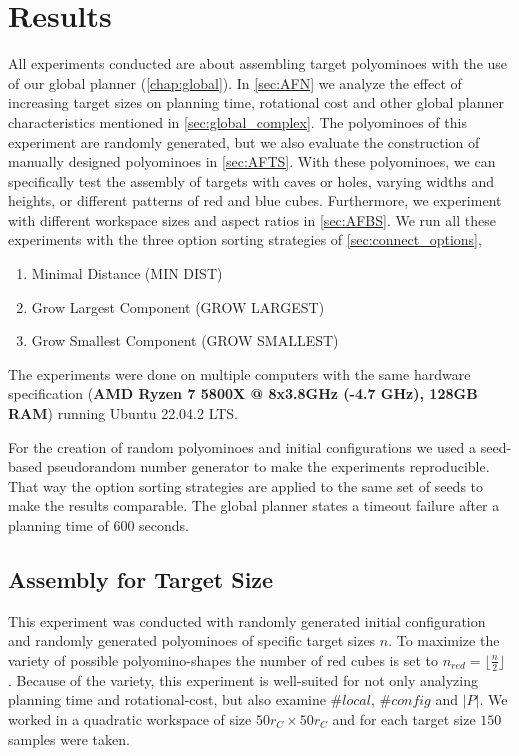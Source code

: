\chapter{Results}
\label{chap:results}

All experiments conducted are about assembling target polyominoes with the use of our global planner (\autoref{chap:global}).
In \autoref{sec:AFN} we analyze the effect of increasing target sizes on planning time, rotational cost and other global planner characteristics mentioned in \autoref{sec:global_complex}.
The polyominoes of this experiment are randomly generated, but we also evaluate the construction of manually designed polyominoes in \autoref{sec:AFTS}.
With these polyominoes, we can specifically test the assembly of targets with caves or holes, varying widths and heights, or different patterns of red and blue cubes. 
Furthermore, we experiment with different workspace sizes and aspect ratios in \autoref{sec:AFBS}.
We run all these experiments with the three option sorting strategies of \autoref{sec:connect_options},
\begin{enumerate}
	\item Minimal Distance (MIN DIST)
	\item Grow Largest Component (GROW LARGEST)
	\item Grow Smallest Component (GROW SMALLEST)
\end{enumerate}

The experiments were done on multiple computers with the same hardware specification (\textbf{AMD Ryzen 7 5800X @ 8x3.8GHz (-4.7 GHz), 128GB RAM}) running Ubuntu 22.04.2 LTS.

For the creation of random polyominoes and initial configurations we used a seed-based pseudorandom number generator to make the experiments reproducible.
That way the option sorting strategies are applied to the same set of seeds to make the results comparable.
The global planner states a timeout failure after a planning time of $600$ seconds.


\section{Assembly for Target Size}
\label{sec:AFN}

This experiment was conducted with randomly generated initial configuration and randomly generated polyominoes of specific target sizes $n$.
To maximize the variety of possible polyomino-shapes the number of red cubes is set to $n_\textit{red} = \lfloor \frac{n}{2} \rfloor$ \cite{Lu2021}.
Because of the variety, this experiment is well-suited for not only analyzing planning time and rotational-cost, but also examine $\#\textit{local}$, $\#\textit{config}$ and $|P|$.
We worked in a quadratic workspace of size $50 r_C \times 50 r_C$ and for each target size $150$ samples were taken.

